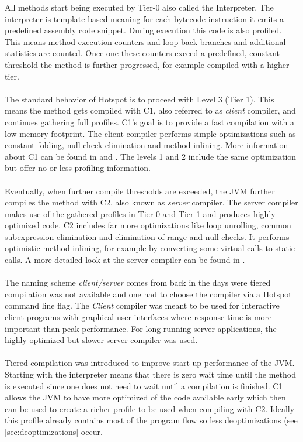 All methods start being executed by Tier-0 also called the Interpreter.
The interpreter is template-based meaning for each bytecode instruction it emits a predefined assembly code snippet.
During execution this code is also profiled. This means method execution counters and loop back-branches and additional statistics are counted. Once one these counters exceed a predefined, constant threshold the method is further progressed, for example compiled with a higher tier.
\\\\
The standard behavior of Hotspot is to proceed with Level 3 (Tier 1). This means the method gets compiled with C1, also referred to as \textit{client} compiler, and continues gathering full profiles.
C1's goal is to provide a fast compilation with a low memory footprint.
The client compiler performs simple optimizations such as constant folding, null check elimination and method inlining.
More information about C1 can be found in \cite{client_compiler_talk} and \cite{client_compiler}.
The levels 1 and 2 include the same optimization but offer no or less profiling information.
\\\\
Eventually, when further compile thresholds are exceeded, the JVM further compiles the method with C2, also known as \textit{server} compiler.
The server compiler makes use of the gathered profiles in Tier 0 and Tier 1 and produces highly optimized code. C2 includes far more optimizations like loop unrolling, common subexpression elimination and elimination of range and null checks. It performs optimistic method inlining, for example by converting some virtual calls to static calls.
A more detailed look at the server compiler can be found in \cite{server_compiler}.
\\\\
The naming scheme \textit{client/server} comes from back in the days were tiered compilation was not available and one had to choose the compiler via a Hotspot command line flag. The \textit{Client} compiler was meant to be used for interactive client programs with graphical user interfaces where response time is more important than peak performance. For long running server applications, the highly optimized but slower server compiler was used. 
\\\\
Tiered compilation was introduced to improve start-up performance of the JVM.
Starting with the interpreter means that there is zero wait time until the method is executed since one does not need to wait until a compilation is finished. C1 allows the JVM to have more optimized of the code available early which then can be used to create a richer profile to be used when compiling with C2. Ideally this profile already contains most of the program flow so less deoptimizations (see \ref{sec:deoptimizations} occur.

